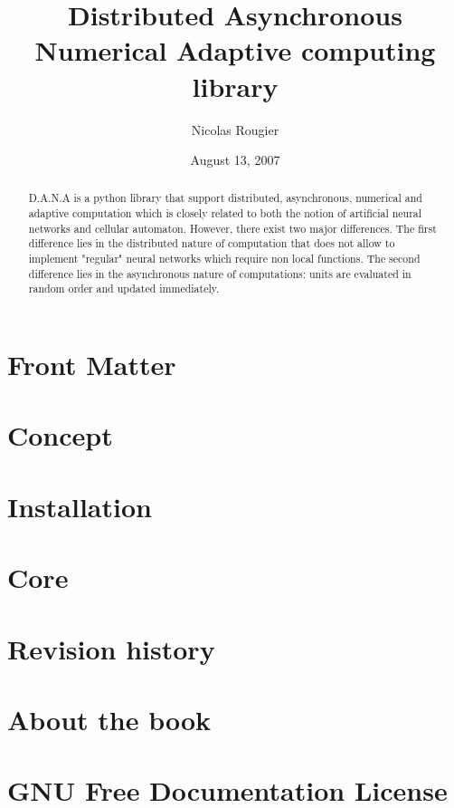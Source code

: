 \documentclass{manual}
\title{Distributed Asynchronous Numerical Adaptive computing library}
\author{Nicolas Rougier}
\date{August 13, 2007}
\begin{document}
\maketitle

\ifhtml
\chapter*{Front Matter\label{front}}
\fi



\begin{abstract}
\noindent
D.A.N.A is a python library that support distributed, asynchronous, numerical and
adaptive computation which is closely related to both the notion of artificial
neural networks and cellular automaton. However, there exist two major
differences. The first difference lies in the distributed nature of computation
that does not allow to implement "regular" neural networks which require non
local functions. The second difference lies in the asynchronous nature of
computations: units are evaluated in random order and updated immediately.
\end{abstract}

\tableofcontents

\chapter{Concept}


\chapter{Installation}


\chapter{Core}


\appendix

\chapter{Revision history}


\chapter{About the book}


\chapter{GNU Free Documentation License \label{License}}



%
%
%

\end{document}
